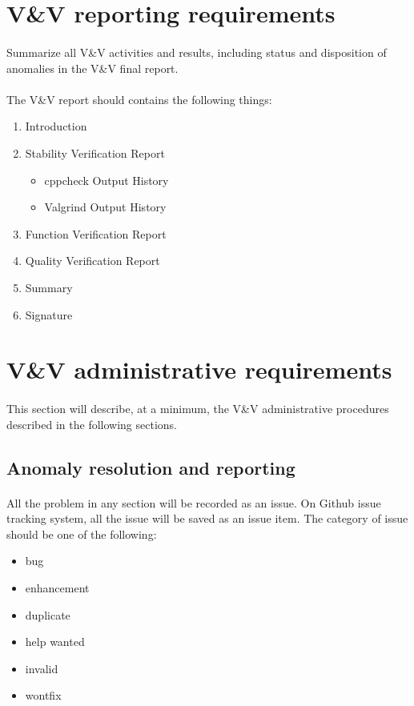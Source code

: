 \documentclass[11pt,a4paper]{article}
\begin{document}
    \section{V\&V reporting requirements}
        \paragraph{} Summarize all V\&V activities and results, including status and disposition of anomalies in the V\&V final report.
        \paragraph{} The V\&V report should contains the following things:
        \begin{enumerate}
            \item Introduction
            \item {Stability Verification Report
                    \begin{itemize}
                        \item cppcheck Output History
                        \item Valgrind Output History
                    \end{itemize}}
            \item Function Verification Report
            \item Quality Verification Report
            \item Summary
            \item Signature
        \end{enumerate}
    \section{V\&V administrative requirements}
        \paragraph{} This section will describe, at a minimum, the V\&V administrative procedures described in the following sections.
        \subsection{Anomaly resolution and reporting}
            \paragraph{} All the problem in any section will be recorded as an issue. On Github issue tracking system, all the issue will be saved as an issue item. The category of issue should be one of the following:
            \begin{itemize}
                \item bug
                \item enhancement
                \item duplicate
                \item help wanted
                \item invalid
                \item wontfix
            \end{itemize}
\end{document}
